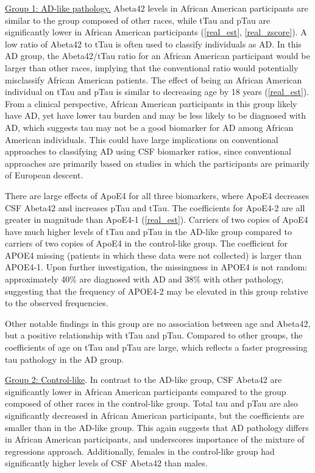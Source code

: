 \documentclass{interact}
\theoremstyle{plain}
\theoremstyle{definition}
\theoremstyle{remark}
\begin{document}
\underline{Group 1: AD-like pathology.}  
Abeta42 levels in African American participants are similar to the group composed of other races, while tTau and pTau are significantly lower in African American participants (\cref{real_est}, \cref{real_zscore}). A low ratio of Abeta42 to tTau is often used to classify individuals as AD. In this AD group, the Abeta42/tTau ratio for an African American participant would be larger than other races, implying that the conventional ratio would potentially misclassify African American patients. The effect of being an African American individual on tTau and pTau is similar to decreasing age by 18 years (\cref{real_est}). From a clinical perspective, African American participants in this group likely have AD, yet have lower tau burden and may be less likely to be diagnosed with AD, which suggests tau may not be a good biomarker for AD among African American individuals. This could have large implications on conventional approaches to classifying AD using CSF biomarker ratios, since conventional approaches are primarily based on studies in which the participants are primarily of European descent. 

There are large effects of ApoE4 for all three biomarkers, where ApoE4 decreases CSF Abeta42 and increases pTau and tTau. The coefficients for ApoE4-2 are all greater in magnitude than ApoE4-1 (\cref{real_est}). Carriers of two copies of ApoE4 have much higher levels of tTau and pTau in the AD-like group compared to carriers of two copies of ApoE4 in the control-like group. The coefficient for APOE4 missing (patients in which these data were not collected) is larger than APOE4-1. Upon further investigation, the missingness in APOE4 is not random: approximately 40\% are diagnosed with AD and 38\% with other pathology, suggesting that the frequency of APOE4-2 may be elevated in this group relative to the observed frequencies.

Other notable findings in this group are no association between age and Abeta42, but a positive relationship with tTau and pTau. Compared to other groups, the coefficients of age on tTau and pTau are large, which reflects a faster progressing tau pathology in the AD group. 

\underline{Group 2: Control-like}. 
In contrast to the AD-like group,  CSF Abeta42 are significantly lower in African American participants compared to the group composed of other races in the control-like group. Total tau and pTau are also significantly decreased in African American participants, but the coefficients are smaller than in the AD-like group. This again suggests that AD pathology differs in African American participants, and underscores importance of the mixture of regressions approach. Additionally, females in the control-like group had significantly higher levels of CSF Abeta42 than males. 
\end{document}
